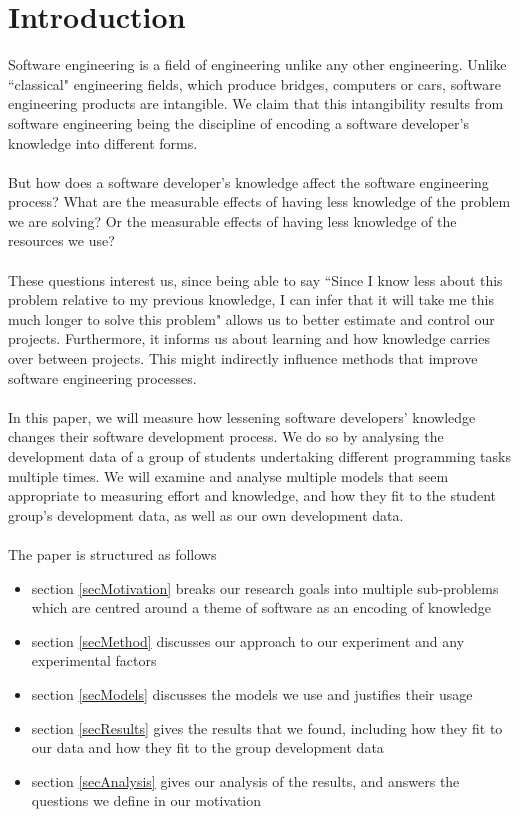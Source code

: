 \section{Introduction} \label{secIntro}

Software engineering is a field of engineering unlike any other engineering.
Unlike ``classical" engineering fields, which produce bridges, computers or
cars, software engineering products are intangible.
We claim that this intangibility results from software engineering being the
discipline of encoding a software developer's knowledge into different forms.\\
\\
But how does a software developer's knowledge affect the software engineering
process?
What are the measurable effects of having less knowledge of the problem we are
solving?
Or the measurable effects of having less knowledge of the resources we use?\\
\\
These questions interest us, since being able to say ``Since I know less about
this problem relative to my previous knowledge, I can infer that it will take me
this much longer to solve this problem" allows us to better estimate and control
our projects.
Furthermore, it informs us about learning and how knowledge carries over between
projects.
This might indirectly influence methods that improve software engineering
processes.\\
\\
In this paper, we will measure how lessening software developers' knowledge
changes their software development process.
We do so by analysing the development data of a group of students undertaking
different programming tasks multiple times.
We will examine and analyse multiple models that seem appropriate to
measuring effort and knowledge, and how they fit to the student group's development data,
as well as our own development data.\\
\\
The paper is structured as follows
\begin{itemize}
  \item section \ref{secMotivation} breaks our research goals
  into multiple sub-problems which are centred around a theme of software as
  an encoding of knowledge
  \item section \ref{secMethod} discusses our approach to our experiment and
  any experimental factors
  \item section \ref{secModels} discusses the models we use and justifies their
  usage
  \item section \ref{secResults} gives the results that we found, including how
  they fit to our data and how they fit to the group development data
  \item section \ref{secAnalysis} gives our analysis of the results, and answers
  the questions we define in our motivation
\end{itemize}
